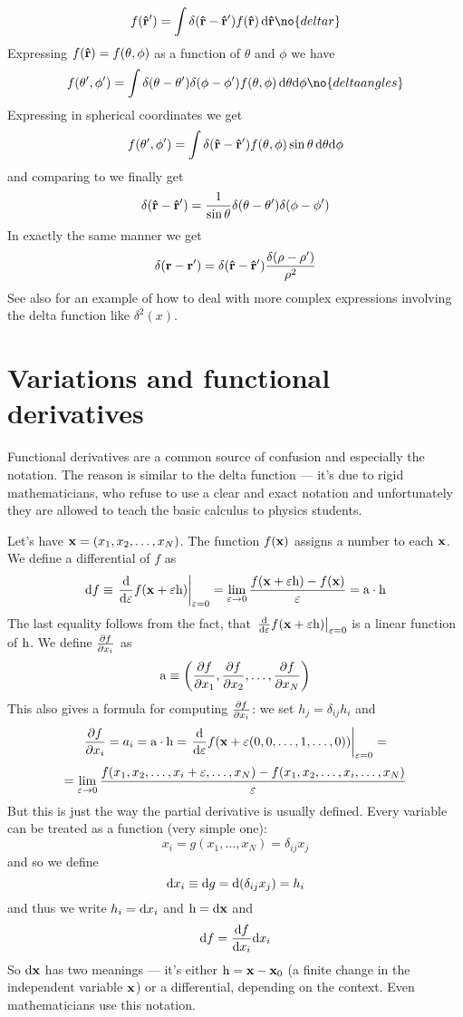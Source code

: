 $$f({\bf\hat r'})=\int\delta({\bf\hat r}-{\bf\hat r'})f({\bf\hat r})\,\d
{\bf\hat r}\no{deltar}$$
Expressing $f({\bf\hat r})=f(\theta,\phi)$ as a function of $\theta$ and $\phi$
we have
$$f(\theta',\phi')=\int\delta(\theta-\theta')\delta(\phi-\phi')
f(\theta,\phi)\,\d\theta\d\phi\no{deltaangles}$$
Expressing  in spherical coordinates we get
$$f(\theta',\phi')=\int\delta({\bf\hat r}-{\bf\hat r'})
f(\theta,\phi)\sin\theta\,{\rm d}\theta{\rm d}\phi$$
and comparing to  we finally get
$$\delta({\bf\hat r}-{\bf\hat r'})={1\over\sin\theta}
\delta(\theta-\theta')\delta(\phi-\phi')$$
In exactly the same manner we get
$$\delta({\bf r}-{\bf r'})=\delta({\bf\hat r}-{\bf\hat r'})
{\delta(\rho-\rho')\over\rho^2}$$
See also  for an example of how to deal with more complex
expressions involving the delta function like $\delta^2(x)$.

\section{Variations and functional derivatives}

Functional derivatives are a common source of confusion and especially the
notation. The reason is similar to the delta function --- it's due to rigid
mathematicians, who refuse to use a clear and exact notation and unfortunately
they are allowed to teach the basic calculus to physics students.

\def\h{{\rm h}}
\def\a{{\rm a}}
Let's have ${\bf x}=(x_1,x_2,\dots,x_N)$. The function $f({\bf x})$ assigns a number
to each ${\bf x}$. We define a differential of $f$ as
$$\d f\equiv \left.{\d\over\d\varepsilon}f(\x+\varepsilon\h)
\right|_{\varepsilon=0}
=\lim_{\varepsilon\to0}
{f(\x+\varepsilon\h)-f(\x)\over\varepsilon}=\a\cdot\h$$
The last equality follows from the fact, that
$\left.{\d\over\d\varepsilon}f(\x+\varepsilon\h) \right|_{\varepsilon=0}$ is a
linear function of $\h$.
We define ${\partial f\over\partial x_i}$ as
$$\a\equiv\left({\partial f\over\partial x_1},{\partial f\over\partial x_2},
\dots,{\partial f\over\partial x_N}\right)$$
This also gives a formula for computing ${\partial f\over\partial x_i}$: we
set $h_j=\delta_{ij}h_i$ and
$${\partial f\over\partial x_i}=a_i=\a\cdot\h=\left.{\d\over\d\varepsilon}
f(\x+\varepsilon(0,0,\dots,1,\dots,0))\right|_{\varepsilon=0}=$$
$$=\lim_{\varepsilon\to0}
{f(x_1,x_2,\dots,x_i+\varepsilon,\dots,x_N)-f(x_1,x_2,\dots,x_i,\dots,x_N)
\over\varepsilon}$$
But this is just the way the partial derivative is usually defined.
Every variable can be treated as a function (very simple one):
$$x_i=g(x_1,\dots,x_N)=\delta_{ij}x_j$$
and so we define
$${\rm d} x_i\equiv{\rm d} g={\rm d}(\delta_{ij}x_j)=h_i$$
and thus we write $h_i={\rm d} x_i$ and $\h=\d\x$ and 
$${\rm d} f={{\rm d} f\over{\rm d} x_i}{\rm d} x_i$$
So ${\rm d}{\bf x}$ has two meanings --- it's either $\h=\x-\x_0$ (a finite change in
the independent variable ${\bf x}$) or a differential,
depending on the context. Even mathematicians use this notation.

